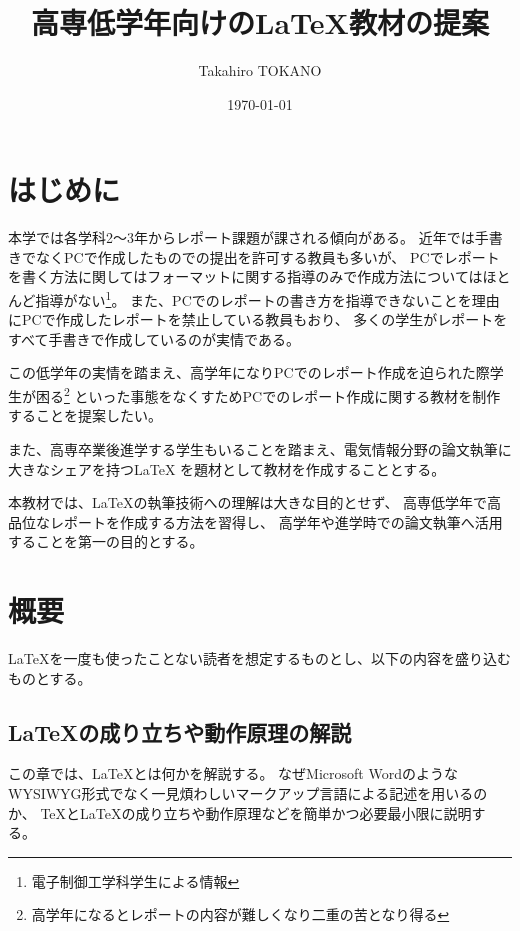 \documentclass[uplatex]{jsarticle}
\title{高専低学年向けの\LaTeX 教材の提案}
\author{Takahiro TOKANO}
\date{\today}
\begin{document}
\maketitle

\section{はじめに}
	本学では各学科2～3年からレポート課題が課される傾向がある。
	近年では手書きでなくPCで作成したものでの提出を許可する教員も多いが、
	PCでレポートを書く方法に関してはフォーマットに関する指導のみで作成方法についてはほとんど指導がない\footnote{電子制御工学科学生による情報}。
	また、PCでのレポートの書き方を指導できないことを理由にPCで作成したレポートを禁止している教員もおり、
	多くの学生がレポートをすべて手書きで作成しているのが実情である。

	この低学年の実情を踏まえ、高学年になりPCでのレポート作成を迫られた際学生が困る\footnote{高学年になるとレポートの内容が難しくなり二重の苦となり得る}
	といった事態をなくすためPCでのレポート作成に関する教材を制作することを提案したい。

	また、高専卒業後進学する学生もいることを踏まえ、電気情報分野の論文執筆に大きなシェアを持つ\LaTeX
    を題材として教材を作成することとする。
    
    本教材では、\LaTeX の執筆技術への理解は大きな目的とせず、
    高専低学年で高品位なレポートを作成する方法を習得し、
    高学年や進学時での論文執筆へ活用することを第一の目的とする。

\section{概要}
	\LaTeX を一度も使ったことない読者を想定するものとし、以下の内容を盛り込むものとする。

    
    \subsection{\LaTeX の成り立ちや動作原理の解説}
        この章では、\LaTeX とは何かを解説する。
        なぜMicrosoft WordのようなWYSIWYG形式でなく一見煩わしいマークアップ言語による記述を用いるのか、
        \TeX と\LaTeX の成り立ちや動作原理などを簡単かつ必要最小限に説明する。
\end{document}
